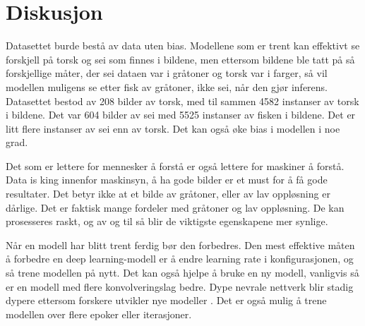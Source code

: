 




\section{Diskusjon}
\label{part:discussion}
Datasettet burde bestå av data uten bias. Modellene som er trent kan effektivt se forskjell på torsk og sei som finnes i bildene, men ettersom bildene ble tatt på så forskjellige måter, der sei dataen var i gråtoner og torsk var i farger, så vil modellen muligens se etter fisk av gråtoner, ikke sei, når den gjør inferens. Datasettet bestod av 208 bilder av torsk, med til sammen 4582 instanser av torsk i bildene. Det var 604 bilder av sei med 5525 instanser av fisken i bildene. Det er litt flere instanser av sei enn av torsk. Det kan også øke bias i modellen i noe grad.

Det som er lettere for mennesker å forstå er også lettere for maskiner å forstå. Data is king innenfor maskinsyn, å ha gode bilder er et must for å få gode resultater. Det betyr ikke at et bilde av gråtoner, eller av lav oppløsning er dårlige. Det er faktisk mange fordeler med gråtoner og lav oppløsning. De kan prosesseres raskt, og av og til så blir de viktigste egenskapene mer synlige.

Når en modell har blitt trent ferdig bør den forbedres. Den mest effektive måten å forbedre en deep learning-modell er å endre learning rate i konfigurasjonen, og så trene modellen på nytt. Det kan også hjelpe å bruke en ny modell, vanligvis så er en modell med flere konvolveringslag bedre. Dype nevrale nettverk blir stadig dypere ettersom forskere utvikler nye modeller \cite{Szegedy m.fl. s. 1}. Det er også mulig å trene modellen over flere epoker eller iterasjoner. 

